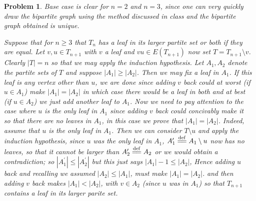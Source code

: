 \documentclass{article}
\newcommand{\defeq}{\overset{\mathrm{def}}{=\joinrel=}}
\newtheorem{prb}{Problem}
\begin{document}
\begin{prb} 

Base case is clear for $n=2$ and $n=3$, since one can very quickly draw the bipartite graph using the method discussed in class and the bipartite graph obtained is unique.  

Suppose that for $n \geq 3$ that $T_n$ has a leaf in its larger partite set or both if they are equal. Let $v, u \in T_{n+1}$ with $v$ a leaf and $vu \in E(T_{n+1})$  
now set $T = T_{n+1} \setminus v$. Clearly $|T| = n$ so that we may apply the induction hypothesis. Let $A_1, A_2$ denote the partite sets of $T$ and 
suppose $|A_1| \geq |A_2|$. Then we may fix a leaf in $A_1$. If this leaf is any vertex other than $u$, we are done since adding $v$ back could at worst 
(if $u \in A_1$) make $|A_1| = |A_2|$ in which case there would be a leaf in both and at best (if $u \in A_2$) we just add another leaf to $A_1$. Now we need to pay attention to the case where $u$ is the only leaf in $A_1$ since adding $v$ back could concivably make it so that there are no leaves in $A_1$, in this case we prove that $|A_1| = |A_2|$. Indeed, assume that $u$ is the only leaf in $A_1$. Then we can consider $T \setminus u$ and apply the induction hypothesis, since $u$ was the only leaf in $A_1$, $A_1^\prime \defeq A_1 \setminus u$ now has no leaves, so that it cannot 
be larger than $A_2^\prime \defeq A_2$ or we would obtain a contradiction; so $|A_1^\prime| \leq |A_2^\prime|$ but this just says 
$|A_1| - 1 \leq |A_2|$, Hence adding $u$ back and recalling we assumed $|A_2| \leq |A_1|$, must make $|A_1| = |A_2|$. 
and then adding $v$ back makes $|A_1| < |A_2|$, 
with $v \in A_2$ (since $u$ was in $A_1$) so that $T_{n+1}$ contains a leaf in its larger parite set. 
\end{prb}
\end{document}
